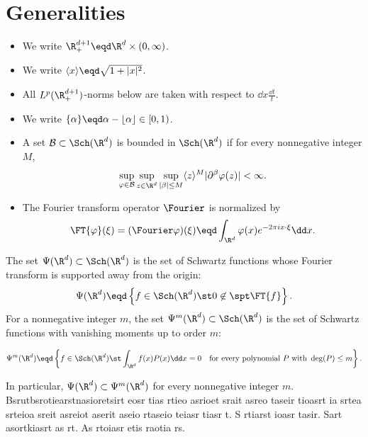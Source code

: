 \section{Generalities}\label{sec:generalities}

\begin{itemize}
\item We write \(\R^{d + 1}_+ \eqd \R^d \times (0, \infty)\).
\item We write \(\langle x \rangle \eqd \sqrt{1 + | x |^2}\).
\item All \(L^p (\R^{d + 1}_+)\)-norms below are taken with respect to \(\dd x \frac{\dd t}{t}\).
\item We write \(\{\alpha\} \eqd \alpha - \lfloor \alpha \rfloor \in [0, 1)\).
\item A set \(\mathcal{B} \subset \Sch (\R^d)\) is bounded in \(\Sch (\R^d)\) if for every nonnegative integer \(M\),
\[
\sup_{\varphi \in \mathcal{B}} \sup_{z \in \R^d}
\sup_{| \beta | \leq M}
\langle z \rangle^M | \partial^{\beta} \varphi (z) | < \infty .
\]
\item The Fourier transform operator \(\Fourier\) is normalized by
\[
\FT{\varphi} (\xi) = (\Fourier \varphi) (\xi)
\eqd \int_{\R^d} \varphi (x) e^{- 2 \pi ix \cdot \xi} \dd x .
\]
\end{itemize}

\begin{definition} \label{def:psi-classes} The set \(\Psi (\R^d) \subset \Sch (\R^d)\) is the set of Schwartz functions whose Fourier transform is supported away from the origin:
\begin{equation} \label{eq:psi-fourier-support}
\Psi (\R^d) \eqd \left\{ f \in \Sch (\R^d) \st 0 \not\in \spt \FT{f} \right\}.
\end{equation}
For a nonnegative integer \(m\), the set \(\Psi^m (\R^d) \subset \Sch (\R^d)\) is the set of Schwartz functions with vanishing moments up to order \(m\):

\begin{equation} \label{eq:psi-vanishing-moments}
\Psi^m (\R^d) \eqd \left\{ f \in \Sch (\R^d) \st \int_{\R^d} f(x) P(x) \dd x = 0
\quad \text{for every polynomial } P \text{ with } \deg(P) \le m \right\}.
\end{equation}

In particular, \(\Psi(\R^d) \subset \Psi^m(\R^d)\) for every nonnegative integer \(m\).
Bsrutbsrotiearstnasioretsirt eosr tias rtieo asrioet srait asreo taseir tioasrt ia srtea srteioa sreit asreiot aserit aseio rtaseio teiasr tiasr t.
S rtiarst ioasr tasir.
Sart asortkiasrt as rt.
As rtoiasr etis raotia rs.
\end{definition}

